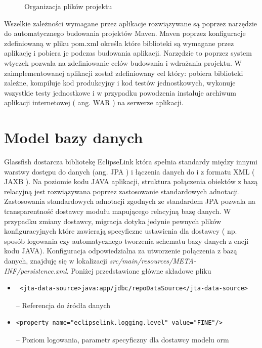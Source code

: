 \begin{figure}[h!]

\caption{Organizacja plików projektu}
\end{figure}

Wszelkie zależności wymagane przez aplikacje rozwiązywane są poprzez narzędzie do automatycznego budowania projektów Maven. Maven poprzez konfiguracje zdefiniowaną w pliku pom.xml określa które biblioteki są wymagane przez aplikację i pobiera je podczas budowania aplikacji. Narzędzie to poprzez system wtyczek pozwala na zdefiniowanie celów budowania i wdrażania projektu. W zaimplementowanej aplikacji został zdefiniowany cel który: pobiera biblioteki zależne, kompiluje kod produkcyjny i kod testów jednostkowych, wykonuje wszystkie testy jednostkowe i w przypadku powodzenia instaluje archiwum aplikacji internetowej ( ang. WAR ) na serwerze aplikacji.


\section{Model bazy danych}
Glassfish dostarcza bibliotekę EclipseLink która spełnia standardy między innymi warstwy dostępu do danych (ang. JPA ) i łączenia danych do i z formatu XML ( JAXB ). Na poziomie kodu JAVA aplikacji, struktura połączenia obiektów z bazą relacyjną jest rozwiązywana poprzez zastosowanie standardowych adnotacji. Zastosowania standardowych adnotacji zgodnych ze standardem JPA pozwala na transparentność dostawcy modułu mapującego relacyjną bazę danych. W przypadku zmiany dostawcy, migracja dotyka jedynie pewnych plików konfiguracyjnych które zawierają specyficzne ustawienia dla dostawcy ( np. sposób logowania czy automatycznego tworzenia schematu bazy danych z encji kodu JAVA).
Konfiguracja odpowiedzialna za utworzenie połączenia z bazą danych, znajduję się w lokalizacji \textit{src/main/resources/META-INF/persistence.xml}. Poniżej przedstawione główne składowe pliku

\begin{itemize}
	\item  {\footnotesize \begin{verbatim} <jta-data-source>java:app/jdbc/repoDataSource</jta-data-source> \end{verbatim}} -- Referencja do źródła danych
 	\item  {\footnotesize \begin{verbatim}<property name="eclipselink.logging.level" value="FINE"/>\end{verbatim}} -- Poziom logowania, parametr specyficzny dla dostawcy modelu orm
\end{itemize}


